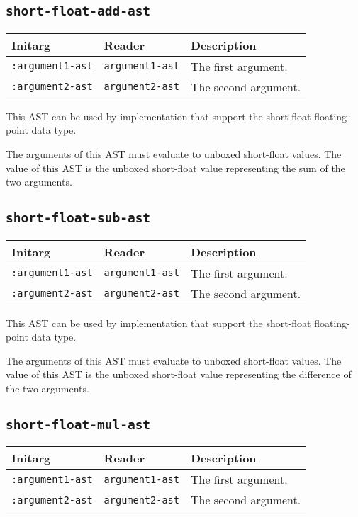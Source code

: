 \subsection{\texttt{short-float-add-ast}}
\label{sec-ast-short-float-add}

\begin{tabular}{|l|l|l|}
\hline
Initarg & Reader & Description\\
\hline\hline
\texttt{:argument1-ast} & \texttt{argument1-ast} & The first argument.\\
\hline
\texttt{:argument2-ast} & \texttt{argument2-ast} & The second argument.\\
\hline
\end{tabular}

This AST can be used by implementation that support the short-float
floating-point data type.  

The arguments of this AST must evaluate to unboxed short-float
values.  The value of this AST is the unboxed short-float value
representing the sum of the two arguments.

\subsection{\texttt{short-float-sub-ast}}
\label{sec-ast-short-float-sub}

\begin{tabular}{|l|l|l|}
\hline
Initarg & Reader & Description\\
\hline\hline
\texttt{:argument1-ast} & \texttt{argument1-ast} & The first argument.\\
\hline
\texttt{:argument2-ast} & \texttt{argument2-ast} & The second argument.\\
\hline
\end{tabular}

This AST can be used by implementation that support the short-float
floating-point data type.  

The arguments of this AST must evaluate to unboxed short-float
values.  The value of this AST is the unboxed short-float value
representing the difference of the two arguments.

\subsection{\texttt{short-float-mul-ast}}
\label{sec-ast-short-float-mul}

\begin{tabular}{|l|l|l|}
\hline
Initarg & Reader & Description\\
\hline\hline
\texttt{:argument1-ast} & \texttt{argument1-ast} & The first argument.\\
\hline
\texttt{:argument2-ast} & \texttt{argument2-ast} & The second argument.\\
\hline
\end{tabular}

